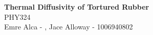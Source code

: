 \documentclass[11pt]{article}
\begin{document}
\begin{center}
    \Large {}  \textbf{Thermal Diffusivity of Tortured Rubber}\\
    \vspace{5pt} 
    \large PHY324\\
    \vspace{5pt}
    Emre Alca - , Jace Alloway - 1006940802
\end{center}

\nd \hrulefill

\vspace{15pt}
\end{document}
